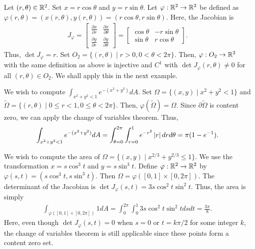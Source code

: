 \begin{example}
    Let $(r,\theta) \in \mathbb{R}^{2}$. Set $x = r \cos \theta$ and $y = r \sin \theta$. Let $\varphi:\mathbb{R}^{2} \to \mathbb{R}^{2}$ be defined as $\varphi(r,\theta) = (x(r,\theta),y(r,\theta)) = (r\cos\theta,r\sin\theta)$. Here, the Jacobian is
    \begin{align}
        J_{\varphi} = \begin{bmatrix}
            \frac{\partial x}{\partial r} & \frac{\partial x}{\partial \theta} \\
            \frac{\partial y}{\partial r} & \frac{\partial y}{\partial \theta}
        \end{bmatrix} = \begin{bmatrix}
            \cos \theta & -r \sin \theta \\
            \sin \theta & r \cos \theta
        \end{bmatrix}.
    \end{align}
    Thus, $\det J_{\varphi} = r$. Set $O_{2} = \{(r,\theta) \mid r > 0, 0 < \theta < 2\pi\}$. Then, $\varphi:O_{2} \to \mathbb{R}^{2}$ with the same definition as above is injective and $C^{1}$ with $\det J_{\varphi}(r,\theta) \neq 0$ for all $(r,\theta) \in O_{2}$. We shall apply this in the next example.
\end{example}

\begin{example}
    We wish to compute $\int_{x^{2}+y^{2} < 1} e^{-(x^{2}+y^{2})} dA$. Set $\Omega = \{(x,y) \mid x^{2}+y^{2} < 1\}$ and $\tilde{\Omega} = \{(r,\theta) \mid 0 \leq r < 1, 0 \leq \theta < 2\pi\}$. Then, $\varphi(\tilde{\Omega}) = \Omega$. Since $\partial \tilde{\Omega}$ is content zero, we can apply the change of variables theorem. Thus,
    \begin{align}
        \int_{x^{2}+y^{2}<1} e^{-(x^{2}+y^{2})} dA = \int_{\theta = 0}^{2\pi} \int_{r=0}^{1} e^{-r^{2}} \left| r \right| dr d\theta = \pi(1-e^{-1}).
    \end{align}
\end{example}

\begin{example}
    We wish to compute the area of $\Omega = \{(x,y) \mid x^{2/3} + y^{2/3} \leq 1\}$. We use the transformation $x = s \cos^{3}t$ and $y = s \sin^{3}t$. Define $\varphi:\mathbb{R}^{2} \to \mathbb{R}^{2}$ by $\varphi(s,t) = (s\cos^{3} t, s \sin^{3} t)$. Then $\Omega = \varphi([0,1] \times [0,2\pi])$. The determinant of the Jacobian is $\det J_{\varphi}(s,t) = 3s \cos^{2} t \sin^{2} t$. Thus, the area is simply
    \begin{align}
        \int_{\varphi([0,1] \times [0,2\pi])} 1 dA = \int_{0}^{2\pi} \int_{0}^{1} 3s \cos^{2} t \sin^{2} t ds dt = \frac{3\pi}{8}.
    \end{align}
    Here, even though $\det J_{\varphi}(s,t) = 0$ when $s=0$ or $t = k\pi/2$ for some integer $k$, the change of variables theorem is still applicable since these points form a content zero set.
\end{example}

